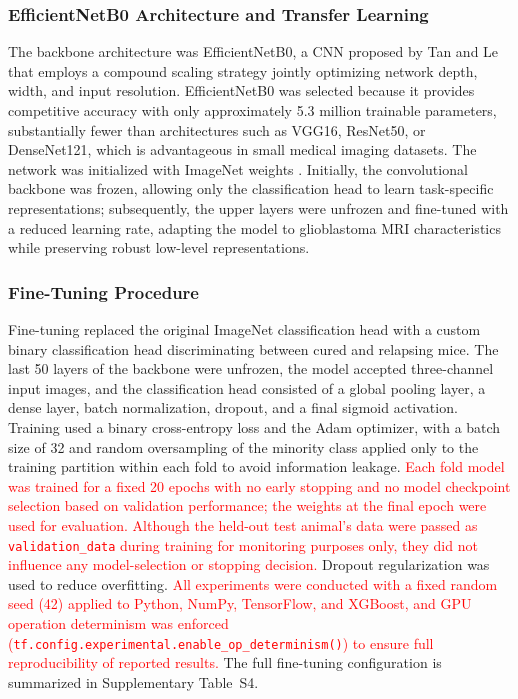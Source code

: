 \documentclass{article}
\begin{document}
\subsubsection{EfficientNetB0 Architecture and Transfer Learning}

The backbone architecture was EfficientNetB0, a CNN proposed by Tan and Le \cite{tan2020efficientnetrethinkingmodelscaling} that employs a compound scaling strategy jointly optimizing network depth, width, and input resolution. EfficientNetB0 was selected because it provides competitive accuracy with only approximately 5.3 million trainable parameters, substantially fewer than architectures such as VGG16, ResNet50, or DenseNet121, which is advantageous in small medical imaging datasets. The network was initialized with ImageNet weights \cite{deng2009}. Initially, the convolutional backbone was frozen, allowing only the classification head to learn task-specific representations; subsequently, the upper layers were unfrozen and fine-tuned with a reduced learning rate, adapting the model to glioblastoma MRI characteristics while preserving robust low-level representations.

\subsubsection{Fine-Tuning Procedure}

Fine-tuning replaced the original ImageNet classification head with a custom binary classification head discriminating between cured and relapsing mice. The last 50 layers of the backbone were unfrozen, the model accepted three-channel input images, and the classification head consisted of a global pooling layer, a dense layer, batch normalization, dropout, and a final sigmoid activation. Training used a binary cross-entropy loss and the Adam optimizer, with a batch size of 32 and random oversampling of the minority class applied only to the training partition within each fold to avoid information leakage. \textcolor{red}{Each fold model was trained for a fixed 20 epochs with no early stopping and no model checkpoint selection based on validation performance; the weights at the final epoch were used for evaluation. Although the held-out test animal's data were passed as \texttt{validation\_data} during training for monitoring purposes only, they did not influence any model-selection or stopping decision.} Dropout regularization was used to reduce overfitting. \textcolor{red}{All experiments were conducted with a fixed random seed (42) applied to Python, NumPy, TensorFlow, and XGBoost, and GPU operation determinism was enforced (\texttt{tf.config.experimental.enable\_op\_determinism()}) to ensure full reproducibility of reported results.} The full fine-tuning configuration is summarized in Supplementary Table~S4.
\end{document}
